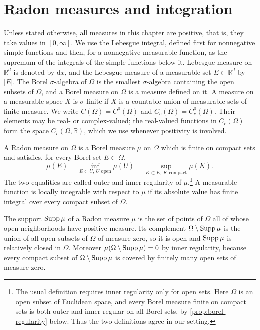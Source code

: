 \section{Radon measures and integration}
\label{sec:radon-measures}
Unless stated otherwise, all measures in this chapter are positive, that is, they take values in $[0,\infty]$. We use the Lebesgue integral, defined first for nonnegative simple functions and then, for a nonnegative measurable function, as the supremum of the integrals of the simple functions below it. Lebesgue measure on $\mathbb R^d$ is denoted by $\mathrm dx$, and the Lebesgue measure of a measurable set $E\subset\mathbb R^d$ by $|E|$. The Borel $\sigma$-algebra of $\Omega$ is the smallest $\sigma$-algebra containing the open subsets of $\Omega$, and a Borel measure on $\Omega$ is a measure defined on it. A measure on a measurable space $X$ is $\sigma$-finite if $X$ is a countable union of measurable sets of finite measure. We write $C(\Omega)=C^0(\Omega)$ and $C_c(\Omega)=C^0_c(\Omega)$. Their elements may be real- or complex-valued; the real-valued functions in $C_c(\Omega)$ form the space $C_c(\Omega,\mathbb R)$, which we use whenever positivity is involved.

\begin{definition}\label{def:radon-measure}
A Radon measure on $\Omega$ is a Borel measure $\mu$ on $\Omega$ which is finite on compact sets and satisfies, for every Borel set $E\subset\Omega$,
\[
 \mu(E)=\inf_{E\subset U,\ U\text{ open}}\mu(U)
       =\sup_{K\subset E,\ K\text{ compact}}\mu(K).
\]
The two equalities are called outer and inner regularity of $\mu$.\footnote{The usual definition requires inner regularity only for open sets. Here $\Omega$ is an open subset of Euclidean space, and every Borel measure finite on compact sets is both outer and inner regular on all Borel sets, by \cref{prop:borel-regularity} below. Thus the two definitions agree in our setting.} A measurable function is locally integrable with respect to $\mu$ if its absolute value has finite integral over every compact subset of $\Omega$.
\end{definition}

The support $\operatorname{Supp}\mu$ of a Radon measure $\mu$ is the set of points of $\Omega$ all of whose open neighborhoods have positive measure. Its complement $\Omega\setminus\operatorname{Supp}\mu$ is the union of all open subsets of $\Omega$ of measure zero, so it is open and $\operatorname{Supp}\mu$ is relatively closed in $\Omega$. Moreover $\mu(\Omega\setminus\operatorname{Supp}\mu)=0$ by inner regularity, because every compact subset of $\Omega\setminus\operatorname{Supp}\mu$ is covered by finitely many open sets of measure zero.

